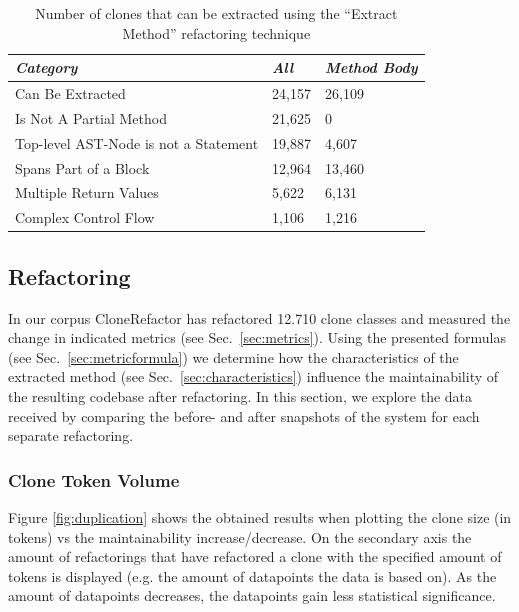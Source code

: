 \documentclass[sigconf,review, table]{acmart}
\begin{document}
\begin{table}[H]
\centering
\begin{tabular}{@{}lll@{}}
\toprule
\textit{\textbf{Category}} & \textit{\textbf{All}} & \textit{\textbf{Method Body}} \\ \midrule
Can Be Extracted & 24,157 & 26,109 \\
Is Not A Partial Method & 21,625 & 0 \\
Top-level AST-Node is not a Statement & 19,887 & 4,607 \\
Spans Part of a Block & 12,964 & 13,460 \\
Multiple Return Values & 5,622 & 6,131 \\
Complex Control Flow & 1,106 & 1,216 \\ \bottomrule
\end{tabular}
\caption{Number of clones that can be extracted using the ``Extract Method'' refactoring technique}
\label{tab:refactorability}
\end{table}

\subsection{Refactoring}
In our corpus CloneRefactor has refactored 12.710 clone classes and measured the change in indicated metrics (see Sec.~\ref{sec:metrics}). Using the presented formulas (see Sec.~\ref{sec:metricformula}) we determine how the characteristics of the extracted method (see Sec.~\ref{sec:characteristics}) influence the maintainability of the resulting codebase after refactoring. In this section, we explore the data received by comparing the before- and after snapshots of the system for each separate refactoring.

\subsubsection{Clone Token Volume}
Figure \ref{fig:duplication} shows the obtained results when plotting the clone size (in tokens) vs the maintainability increase/decrease. On the secondary axis the amount of refactorings that have refactored a clone with the specified amount of tokens is displayed (e.g. the amount of datapoints the data is based on). As the amount of datapoints decreases, the datapoints gain less statistical significance.
\end{document}
